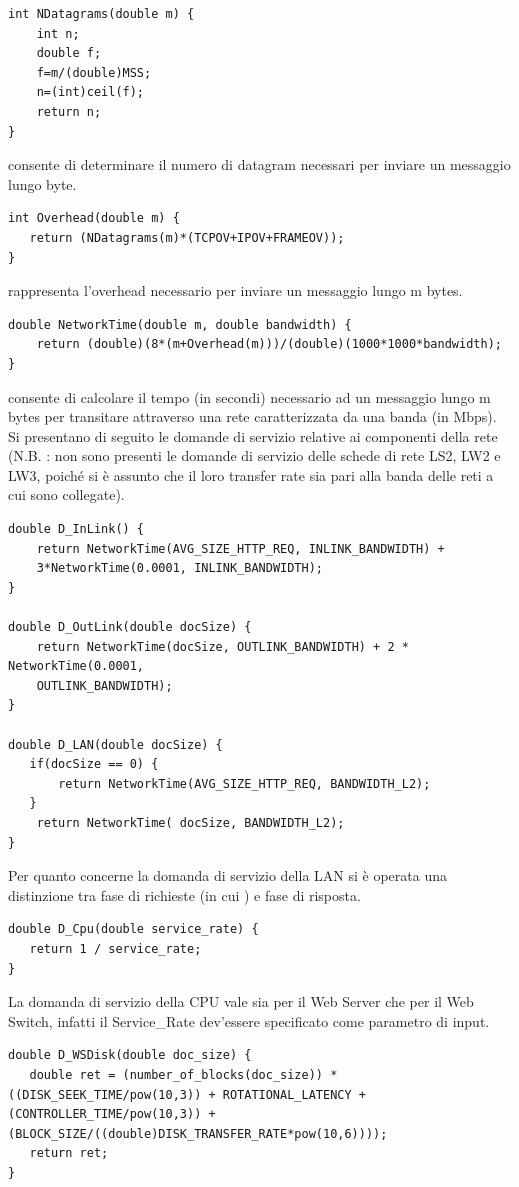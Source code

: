 \begin{lstlisting}
int NDatagrams(double m) { 
	int n; 
	double f; 
	f=m/(double)MSS;
	n=(int)ceil(f); 
	return n; 
} 
\end{lstlisting}
 consente di determinare il numero di datagram necessari per inviare un messaggio lungo  byte.
\begin{lstlisting}
int Overhead(double m) { 
   return (NDatagrams(m)*(TCPOV+IPOV+FRAMEOV));
}
\end{lstlisting}
 rappresenta l'overhead necessario per inviare un messaggio lungo m bytes.
\begin{lstlisting}
double NetworkTime(double m, double bandwidth) { 
	return (double)(8*(m+Overhead(m)))/(double)(1000*1000*bandwidth); 
}
\end{lstlisting}
 consente di calcolare il tempo (in secondi) necessario ad un messaggio lungo m bytes per transitare attraverso una rete caratterizzata da una banda  (in Mbps).
Si presentano di seguito le domande di servizio relative ai componenti della rete (N.B. : non sono presenti le domande di servizio delle schede di rete LS2, LW2 e LW3, poiché si è assunto che il loro transfer rate sia pari alla banda delle reti a cui sono collegate).
\begin{lstlisting}
double D_InLink() { 
    return NetworkTime(AVG_SIZE_HTTP_REQ, INLINK_BANDWIDTH) +    
    3*NetworkTime(0.0001, INLINK_BANDWIDTH); 
} 

double D_OutLink(double docSize) { 
    return NetworkTime(docSize, OUTLINK_BANDWIDTH) + 2 * NetworkTime(0.0001,   
    OUTLINK_BANDWIDTH); 
} 

double D_LAN(double docSize) { 
   if(docSize == 0) { 
       return NetworkTime(AVG_SIZE_HTTP_REQ, BANDWIDTH_L2); 
   } 
    return NetworkTime( docSize, BANDWIDTH_L2); 
} 
\end{lstlisting}
Per quanto concerne la domanda di servizio della LAN si è operata una distinzione tra fase di richieste (in cui ) e fase di risposta.
\begin{lstlisting}
double D_Cpu(double service_rate) { 
   return 1 / service_rate;
}
\end{lstlisting}
La domanda di servizio della CPU vale sia per il Web Server che per il Web Switch, infatti il Service\_Rate dev'essere specificato come parametro di input.
\begin{lstlisting}
double D_WSDisk(double doc_size) { 
   double ret = (number_of_blocks(doc_size)) * ((DISK_SEEK_TIME/pow(10,3)) + ROTATIONAL_LATENCY + (CONTROLLER_TIME/pow(10,3)) + (BLOCK_SIZE/((double)DISK_TRANSFER_RATE*pow(10,6))));
   return ret;
}
\end{lstlisting}
